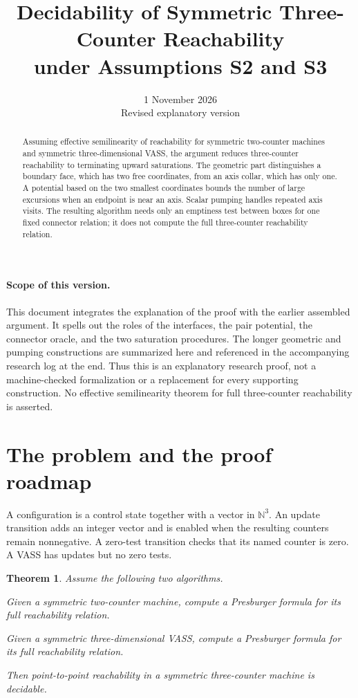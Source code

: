 \documentclass[11pt,a4paper]{article}
\title{Decidability of Symmetric Three-Counter Reachability\\
under Assumptions S2 and S3}
\author{}
\date{1 November 2026\\Revised explanatory version}
\newtheorem{theorem}{Theorem}
\theoremstyle{remark}
\newcommand{\N}{\mathbb N}
\begin{document}
\maketitle

\begin{abstract}
Assuming effective semilinearity of reachability for symmetric
 two-counter machines and symmetric three-dimensional VASS, the argument
reduces three-counter reachability to terminating upward saturations.
The geometric part distinguishes a boundary face, which has two free
coordinates, from an axis collar, which has only one. A potential based
on the two smallest coordinates bounds the number of large excursions
when an endpoint is near an axis. Scalar pumping handles repeated axis
visits. The resulting algorithm needs only an emptiness test between
boxes for one fixed connector relation; it does not compute the full
three-counter reachability relation.
\end{abstract}

\paragraph{Scope of this version.}
This document integrates the explanation of the proof with the earlier
assembled argument. It spells out the roles of the interfaces, the pair
potential, the connector oracle, and the two saturation procedures.
The longer geometric and pumping constructions are summarized here and
referenced in the accompanying research log at the end. Thus this is an
explanatory research proof, not a machine-checked formalization or a
replacement for every supporting construction. No effective
semilinearity theorem for full three-counter reachability is asserted.

\tableofcontents
\bigskip
\section{The problem and the proof roadmap}\label{sec:roadmap}

A configuration is a control state together with a vector in \(\N^3\).
An update transition adds an integer vector and is enabled when the
resulting counters remain nonnegative. A zero-test transition checks
that its named counter is zero. A VASS has updates but no zero tests.

\begin{theorem}\label{thm:main}
Assume the following two algorithms.
\begin{description}[leftmargin=2.8em,style=nextline]
\item[\textnormal{\textbf{S2}}] Given a symmetric two-counter machine,
compute a Presburger formula for its full reachability relation.
\item[\textnormal{\textbf{S3}}] Given a symmetric three-dimensional VASS,
compute a Presburger formula for its full reachability relation.
\end{description}
Then point-to-point reachability in a symmetric three-counter machine
is decidable.
\end{theorem}
\end{document}
